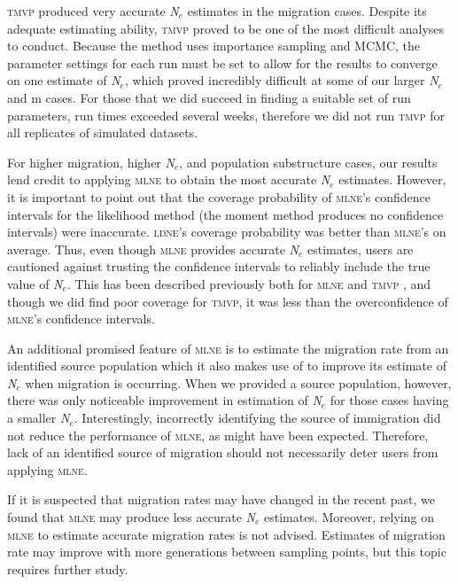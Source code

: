 \textsc{tmvp} produced very accurate \emph{N}$_e$ estimates in the migration cases. Despite 
its adequate estimating ability, \textsc{tmvp} proved to be one of the most difficult analyses to conduct. 
Because the method uses importance sampling and MCMC, the parameter settings for each run must be set to 
allow for the results to converge on one estimate of \emph{N}$_e$, which proved incredibly difficult at 
some of our larger \emph{N}$_e$ and m cases. For those that we did succeed in finding a suitable set of 
run parameters, run times exceeded several weeks, therefore we did not run \textsc{tmvp} for all 
replicates of simulated datasets.

For higher migration, higher \emph{N}$_e$, and population substructure cases, our results 
lend credit to applying \textsc{mlne} to obtain the most accurate \emph{N}$_e$ estimates. However, 
it is important to point out that the coverage probability of \textsc{mlne}'s confidence intervals 
for the likelihood method (the moment method produces no confidence
intervals) were inaccurate. \textsc{ldne}'s coverage probability was better than \textsc{mlne}'s 
on average. Thus, even though \textsc{mlne} provides accurate \emph{N}$_e$ estimates, users are 
cautioned against trusting the confidence intervals to reliably include the true value of \emph{N}$_e$. 
This has been described previously both for \textsc{mlne} and \textsc{tmvp} \citep{Tallmon:2004}, and 
though we did find poor coverage for \textsc{tmvp}, it was less than the overconfidence of 
\textsc{mlne}'s confidence intervals.

An additional promised feature of \textsc{mlne} is to estimate the migration rate from an 
identified source population which it also makes use of to improve its estimate of \emph{N}$_e$ 
when migration is occurring. When we provided a source population, however, there was only noticeable 
improvement in estimation of \emph{N}$_e$ for those cases having a smaller \emph{N}$_e$. 
Interestingly, incorrectly identifying the source of immigration did not reduce the performance of 
\textsc{mlne}, as might have been expected. Therefore, lack of an identified source of migration 
should not necessarily deter users from applying \textsc{mlne}.

If it is suspected that migration rates may have changed in the recent past, we found that 
\textsc{mlne} may produce less accurate \emph{N}$_e$ estimates. Moreover, relying on \textsc{mlne} 
to estimate accurate migration rates is not advised. Estimates of migration rate may improve with 
more generations between sampling points, but this topic requires further study.

